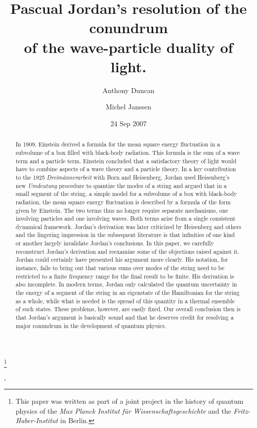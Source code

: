 \documentclass[12pt]{elsart}
\date{24 Sep 2007}
\begin{document}
\begin{frontmatter}


\title{Pascual Jordan's resolution of the conundrum \\ of the wave-particle
duality of light.}
\thanks[mpiwg]{This paper was written as part of a joint project in the history of quantum physics of the {\it Max Planck Institut f\"{u}r Wissenschaftsgeschichte} and the {\it Fritz-Haber-Institut} in Berlin.}


\author[duncan]{Anthony Duncan},
\author[janssen]{Michel Janssen}
\address[duncan]{Department of Physics and Astronomy, University of Pittsburgh}
\address[janssen]{Program in the History of Science, Technology, and Medicine, \\ University of Minnesota}

\begin{abstract}
In 1909, Einstein derived a formula for the mean square energy fluctuation in a subvolume of a box filled with black-body radiation. This formula is the sum of a wave term and a particle term. Einstein concluded that a satisfactory theory of light would have to combine aspects of a wave theory and a particle theory. In a key contribution to the 1925 {\it Dreim\"annerarbeit} with Born and Heisenberg, Jordan used Heisenberg's new {\it Umdeutung} procedure to quantize the modes of a string and argued that in a small segment of the string, a simple model for a subvolume of a box with black-body radiation, the mean square energy fluctuation is described by a formula of the form given by Einstein. The two terms thus no longer require separate mechanisms, one involving particles and one involving waves. Both terms arise from a single consistent dynamical framework. Jordan's derivation was later criticized by Heisenberg and others and the lingering impression in the subsequent literature is that infinities of one kind or another largely invalidate Jordan's conclusions. In this paper, we carefully reconstruct Jordan's derivation and reexamine some of the objections raised against it. Jordan could certainly have presented his argument more clearly. His notation, for instance, fails to bring out that various sums over modes of the string need to be restricted to a finite frequency range for the final result to be finite. His derivation is also incomplete. In modern terms, Jordan only calculated the quantum uncertainty in the energy of a segment of the string in an eigenstate of the Hamiltonian for the string as a whole, while what is needed is the spread of this quantity in a thermal ensemble of such states. These problems, however, are easily fixed. Our overall conclusion then is that Jordan's argument is basically sound and that he deserves credit for resolving a major conundrum in the development of quantum physics.
\end{abstract}


\end{frontmatter}
\end{document}
